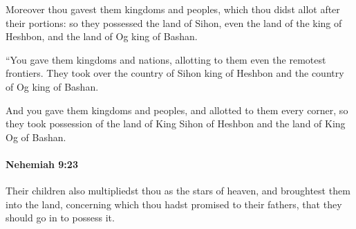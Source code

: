 			\begin{versebox}
					\item[BHS] 
					\item[LXX] 
					\item[ASV] Moreover thou gavest them kingdoms and peoples, which thou didst allot after their portions: so they possessed the land of Sihon, even the land of the king of Heshbon, and the land of Og king of Bashan.
					\item[NIV] “You gave them kingdoms and nations, allotting to them even the remotest frontiers. They took over the country of Sihon king of Heshbon and the country of Og king of Bashan.
					\item[NRSV] And you gave them kingdoms and peoples, and allotted to them every corner, so they took possession of the land of King Sihon of Heshbon and the land of King Og of Bashan.
			\end{versebox}

		\paragraph{Nehemiah 9:23} %
			\label{NEHEMIAH-9-23}

			Their children also multipliedst thou as the stars of heaven, and broughtest them into the land, concerning which thou hadst promised to their fathers, that they should go in to possess it.

